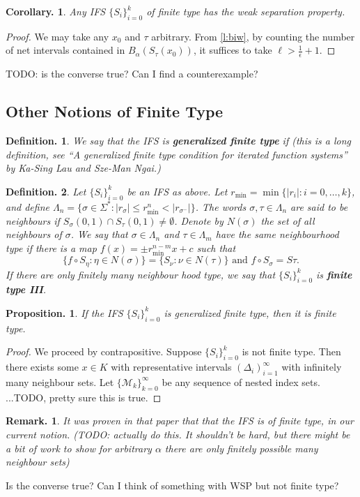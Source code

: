 \documentclass[11pt, a4paper]{memoir}
\theoremstyle{change}
\newtheorem{corollary}[theorem]{Corollary.}
\newtheorem{proposition}[theorem]{Proposition.}
\theoremstyle{plain}
\theoremstyle{nonumberplain}
\newtheorem{definition}{Definition.}
\newtheorem{remark}{Remark.}
\newtheorem{proof}{Proof}
\numberwithin{equation}{section}
\begin{document}
\begin{corollary}
    Any IFS $\{S_i\}_{i=0}^k$ of finite type has the weak separation property.
\end{corollary}
\begin{proof}
    We may take any $x_0$ and $\tau$ arbitrary.
    From \cref{l:biw}, by counting the number of net intervals contained in $B_\alpha(S_\tau(x_0))$, it suffices to take $\ell>\frac{1}{\epsilon}+1$.
\end{proof}
TODO: is the converse true?
Can I find a counterexample?
\subsection{Other Notions of Finite Type}
\begin{definition}
    We say that the IFS is \textbf{generalized finite type} if (this is a long definition, see ``A generalized finite type condition for iterated function systems'' by Ka-Sing Lau and Sze-Man Ngai.)
\end{definition}
\begin{definition}
    Let $\{S_i\}_{i=0}^k$ be an IFS as above.
    Let $r_{\min}=\min\{|r_i|:i=0,\ldots,k\}$, and define $\Lambda_n=\{\sigma\in\Sigma^*:|r_\sigma|\leq r_{\min}^n<|r_{\sigma^-}|\}$.
    The words $\sigma,\tau\in\Lambda_n$ are said to be neighbours if $S_\sigma(0,1)\cap S_\tau(0,1)\neq\emptyset$.
    Denote by $N(\sigma)$ the set of all neighbours of $\sigma$.
    We say that $\sigma\in\Lambda_n$ and $\tau\in\Lambda_m$ have the same neighbourhood type if there is a map $f(x) = \pm r_{\min}^{n-m}x + c$ such that
    \begin{equation*}
        \{f\circ S_\eta : \eta \in N(\sigma)\} = \{S_\nu : \nu\in N(\tau)\}\text{ and }f\circ S_\sigma = S\tau.
    \end{equation*}
    If there are only finitely many neighbour hood type, we say that $\{S_i\}_{i=0}^k$ is \textbf{finite type III}.
\end{definition}
\begin{proposition}
    If the IFS $\{S_i\}_{i=0}^k$ is generalized finite type, then it is finite type.
\end{proposition}
\begin{proof}
    We proceed by contrapositive.
    Suppose $\{S_i\}_{i=0}^k$ is not finite type.
    Then there exists some $x\in K$ with representative intervals $(\Delta_i)_{i=1}^\infty$ with infinitely many neighbour sets.
    Let $\{\mathcal{M}_k\}_{k=0}^\infty$ be any sequence of nested index sets.
    ...TODO, pretty sure this is true.
\end{proof}
\begin{remark}
    It was proven in that paper that that the IFS is of finite type, in our current notion.
    (TODO: actually do this. It shouldn't be hard, but there might be a bit of work to show for arbitrary $\alpha$ there are only finitely possible many neighbour sets)
\end{remark}
Is the converse true?
Can I think of something with WSP but not finite type?
\end{document}
